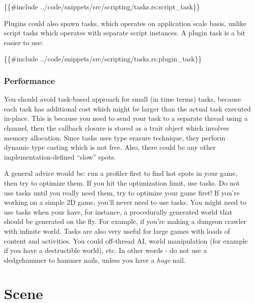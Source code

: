 \documentclass[
]{book}
\newenvironment{Shaded}{\begin{snugshade}}{\end{snugshade}}
\newcommand{\NormalTok}[1]{#1}
\theoremstyle{definition}
\theoremstyle{definition}
\theoremstyle{definition}
\theoremstyle{definition}
\theoremstyle{remark}
\begin{document}
\begin{Shaded}
\begin{Highlighting}[]
\NormalTok{\{\{\#include ../code/snippets/src/scripting/tasks.rs:script\_task\}\}}
\end{Highlighting}
\end{Shaded}

Plugins could also spawn tasks, which operates on application scale basis, unlike script tasks which operates with separate script instances. A plugin task is a bit easier to use:

\begin{Shaded}
\begin{Highlighting}[]
\NormalTok{\{\{\#include ../code/snippets/src/scripting/tasks.rs:plugin\_task\}\}}
\end{Highlighting}
\end{Shaded}

\subsection{Performance}\label{performance-1}

You should avoid task-based approach for small (in time terms) tasks, because each task has additional cost which might be larger than the actual task executed in-place. This is because you need to send your task to a separate thread using a channel, then the callback closure is stored as a trait object which involves memory allocation. Since tasks uses type erasure technique, they perform dynamic type casting which is not free. Also, there could be any other implementation-defined ``slow'' spots.

A general advice would be: run a profiler first to find hot spots in your game, then try to optimize them. If you hit the optimization limit, use tasks. Do not use tasks until you really need them, try to optimize your game first! If you're working on a simple 2D game, you'll never need to use tasks. You might need to use tasks when your have, for instance, a procedurally generated world that should be generated on the fly. For example, if you're making a dungeon crawler with infinite world. Tasks are also very useful for large games with loads of content and activities. You could off-thread AI, world manipulation (for example if you have a destructible world), etc. In other words - do not use a sledgehammer to hammer nails, unless you have a \emph{huge} nail.

\chapter{Scene}\label{scene-1}
\end{document}
